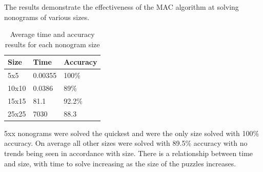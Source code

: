 \documentclass[12pt, letterpaper]
{article}
\begin{document}
The results demonstrate the effectiveness of the MAC algorithm at solving nonograms of various sizes. 
\begin{table}[!ht]
    \caption{Average time and accuracy results for each nonogram size}
    \centering
    \begin{tabular}{lll}
    \hline
        \textbf{Size} & \textbf{Time} & \textbf{Accuracy} \\ \hline
        5x5 & 0.00355 & 100\% \\ 
        10x10 & 0.0386 & 89\% \\ 
        15x15 & 81.1 & 92.2\% \\ 
        25x25 & 7030 & 88.3 \\ \hline
    \end{tabular}
\end{table}
5xx nonograms were solved the quickest and were the only size solved with 100\% accuracy. On average all other sizes were solved with 89.5\% accuracy with no trends being seen in accordance with size. There is a relationship between time and size, with time to solve increasing as the size of the puzzles increases.
\end{document}
